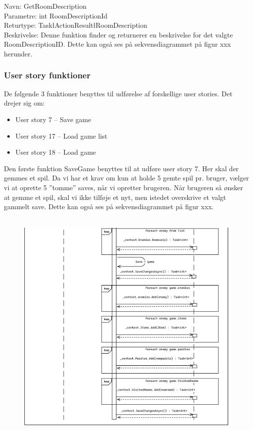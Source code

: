 Navn: GetRoomDescription \\
Parametre: int RoomDescriptionId \\
Returtype: Task\l ActionResult\l RoomDescription\g\g \\
Beskrivelse: Denne funktion finder og returnerer en beskrivelse for det valgte RoomDescriptionID. 
Dette kan også ses på sekvensdiagrammet på figur xxx herunder.


\subsubsection{User story funktioner}
De følgende 3 funktioner benyttes til udførelse af forskellige user stories.
Det drejer sig om:
\begin{itemize}
\item User story 7 – Save game
\item User story 17 – Load game list
\item User story 18 – Load game \\
\end{itemize}

Den første funktion SaveGame benyttes til at udføre user story 7.
Her skal der gemmes et spil.
Da vi har et krav om kun at holde 5 gemte spil pr. bruger, vælger vi at oprette 5 ”tomme” saves, når vi opretter brugeren.  
Når brugeren så ønsker at gemme et spil, skal vi ikke tilføje et nyt, men istedet overskrive et valgt gammelt save.
Dette kan også ses på sekvensdiagrammet på figur xxx.\\\\


\begin{figure}[H]
\centering
\includegraphics[width = \textwidth]{02-Body/Images/DAL-Database/SaveSd2.PNG}
\caption{}
\label{fig:DAL-Sekvens-7}
\end{figure}


